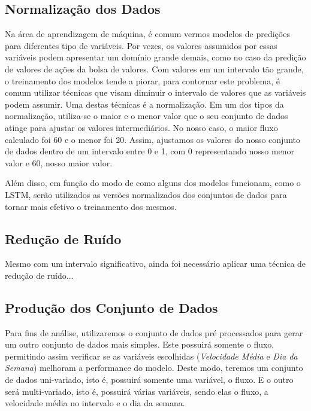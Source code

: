 \subsection{Normalização dos Dados}
Na área de aprendizagem de máquina, é comum vermos modelos de predições para diferentes tipo de variáveis. Por vezes, os valores assumidos por essas variáveis podem apresentar um domínio grande demais, como no caso da predição de valores de ações da bolsa de valores. Com valores em um intervalo tão grande, o treinamento dos modelos tende a piorar, para contornar este problema, é comum utilizar técnicas que visam diminuir o intervalo de valores que as variáveis podem assumir. Uma destas técnicas é a normalização. Em um dos tipos da normalização, utiliza-se o maior e o menor valor que o seu conjunto de dados atinge para ajustar os valores intermediários. No nosso caso, o maior fluxo calculado foi 60 e o menor foi 20. Assim, ajustamos os valores do nosso conjunto de dados dentro de um intervalo entre 0 e 1, com 0 representando nosso menor valor e 60, nosso maior valor. 

Além disso, em função do modo de como alguns dos modelos funcionam, como o LSTM, serão utilizados as versões normalizados dos conjuntos de dados para tornar mais efetivo o treinamento dos mesmos.

{\color{red} \subsection{Redução de Ruído}

Mesmo com um intervalo significativo, ainda foi necessário aplicar uma técnica de redução de ruído...}

\subsection{Produção dos Conjunto de Dados}

Para fins de análise, utilizaremos o conjunto de dados pré processados para gerar um outro conjunto de dados mais simples. Este possuirá somente o fluxo, permitindo assim verificar se as variáveis escolhidas (\textit{Velocidade Média} e \textit{Dia da Semana}) melhoram a performance do modelo. Deste modo, teremos um conjunto de dados uni-variado, isto é, possuirá somente uma variável, o fluxo. E o outro será multi-variado, isto é, possuirá várias variáveis, sendo elas o fluxo, a velocidade média no intervalo e o dia da semana.

